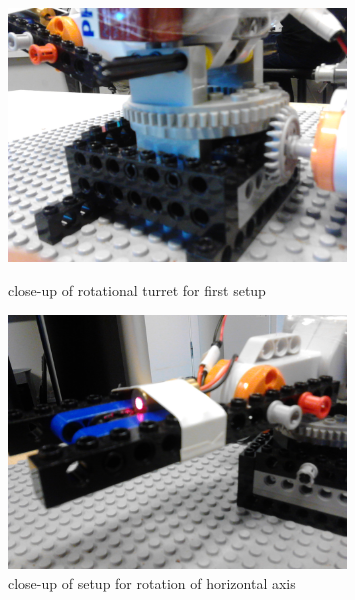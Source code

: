 \begin{figure}[H]
    \begin{minipage}{0.5\textwidth}
    	\centering
    	\includegraphics[width=0.80\textwidth]{graphics/rig/rig_horizontal_turret.jpg}
    	\caption{close-up of rotational turret for first setup}
    	\label{fig:rig_horizontal_base}
    \end{minipage}%
	\begin{minipage}{0.5\textwidth}
    	\centering
    	\includegraphics[width=0.80\textwidth]{graphics/rig/rig_vertical.jpg}
    	\caption{close-up of setup for rotation of horizontal axis}
    	\label{fig:rig_horizontal_rotation}
	\end{minipage}
\end{figure}

